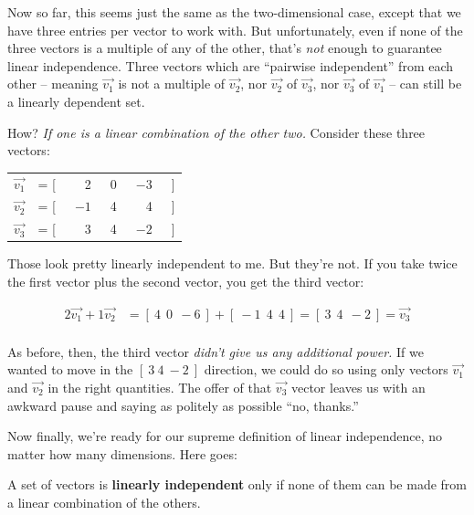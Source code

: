 \medskip

Now so far, this seems just the same as the two-dimensional case, except that
we have three entries per vector to work with. But unfortunately, even if none
of the three vectors is a multiple of any of the other, that's \textit{not}
enough to guarantee linear independence. Three vectors which are ``pairwise
independent'' from each other -- meaning $\overrightarrow{v_1}$ is not a
multiple of $\overrightarrow{v_2}$, nor $\overrightarrow{v_2}$ of
$\overrightarrow{v_3}$, nor $\overrightarrow{v_3}$ of $\overrightarrow{v_1}$ --
can still be a linearly dependent set.


How? \textit{If one is a linear combination of the other two.} Consider these
three vectors:

\begin{center}
\begin{tabular}{rlrrrl}
$\overrightarrow{v_1}$ &= [\ & 2\ & 0\ & $-3$\ & ] \\
$\overrightarrow{v_2}$ &= [\ & $-1$\ & 4\ & 4\ & ] \\
$\overrightarrow{v_3}$ &= [\ & 3\ & 4\ & $-2$\ & ] \\
\end{tabular}
\end{center}

Those look pretty linearly independent to me. But they're not. If you take
twice the first vector plus the second vector, you get the third vector:

\begin{align*}
2 \overrightarrow{v_1} + 1 \overrightarrow{v_2} &=
[\ 4\ \ 0\ \ -6\ ] + [\ -1\ \ 4\ \ 4\ ] = [\ 3\ \ 4\ \ -2\ ] = \overrightarrow{v_3} \\
\end{align*}

As before, then, the third vector \textit{didn't give us any additional power.}
If we wanted to move in the $[\ 3\ 4\ -2\ ]$ direction, we could do so using
only vectors $\overrightarrow{v_1}$ and $\overrightarrow{v_2}$ in the right
quantities. The offer of that $\overrightarrow{v_3}$ vector leaves us with an
awkward pause and saying as politely as possible ``no, thanks.''

Now finally, we're ready for our supreme definition of linear independence, no
matter how many dimensions. Here goes:

\begin{framed}
A set of vectors is \textbf{linearly independent} only if none of them can be
made from a linear combination of the others.
\end{framed}


